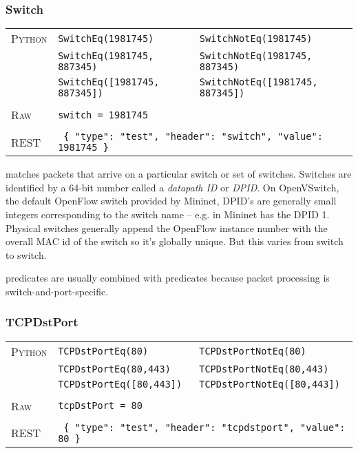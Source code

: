 \subsubsection{Switch}

\bigskip
\begin{tabularx}{\linewidth}{lXX}
\textsc{Python} 	& \texttt{SwitchEq(1981745)} 		& \texttt{SwitchNotEq(1981745)} \\
	 	& \texttt{SwitchEq(1981745, 887345)} 	& \texttt{SwitchNotEq(1981745, 887345)} \\
	 	& \texttt{SwitchEq([1981745, 887345])} 	& \texttt{SwitchNotEq([1981745, 887345])} \\ \\
\textsc{Raw}		& \texttt{switch = 1981745} 		& \\ \\
\textsc{REST}	& \multicolumn{2}{l}{\texttt{ \{ "type": "test", "header": "switch", "value": 1981745 \} }} 
\end{tabularx}

 matches packets that arrive on a particular switch or set of switches.  
Switches are identified by 
a 64-bit number called a \emph{datapath ID} or \emph{DPID}.  On OpenVSwitch, the default OpenFlow
switch provided by Mininet, DPID's are generally small integers corresponding to the switch name --
e.g.  in Mininet has the DPID 1.  Physical switches generally append the OpenFlow instance
number with the overall MAC id of the switch so it's globally unique.  But this varies from switch
to switch. 

 predicates are usually combined with  predicates because packet processing
is switch-and-port-specific.  

\subsubsection{TCPDstPort}

\bigskip
\begin{tabularx}{\linewidth}{lXX}
\textsc{Python}   & \texttt{TCPDstPortEq(80)}    & \texttt{TCPDstPortNotEq(80)} \\
    & \texttt{TCPDstPortEq(80,443)}  & \texttt{TCPDstPortNotEq(80,443)} \\
    & \texttt{TCPDstPortEq([80,443])}  & \texttt{TCPDstPortNotEq([80,443])} \\ \\
\textsc{Raw}    & \texttt{tcpDstPort = 80}     & \\ \\
\textsc{REST} & \multicolumn{2}{l}{\texttt{ \{ "type": "test", "header": "tcpdstport", "value": 80 \} }} 
\end{tabularx}

